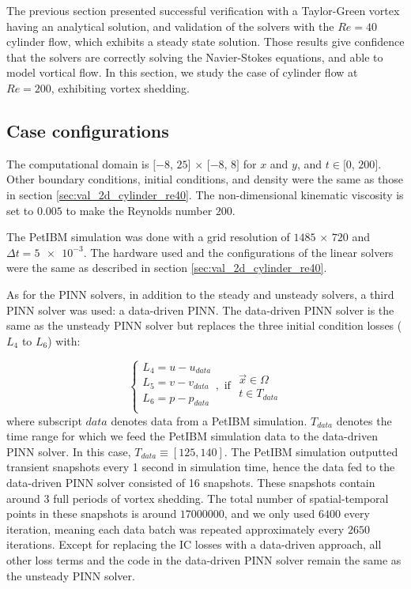 
The previous section presented successful verification with a Taylor-Green vortex having an analytical solution, and validation of the solvers with the $Re=40$ cylinder flow, which exhibits a steady state solution.
Those results give confidence that the solvers are correctly solving the Navier-Stokes equations, and able to model vortical flow. In this section, we study the case of cylinder flow at $Re=200$, exhibiting vortex shedding.

\subsection{Case configurations}

The computational domain is $[-8$, $25]$ $\times$ $[-8$, $8]$ for $x$ and $y$, and $t\in[0$, $200]$.
Other boundary conditions, initial conditions, and density were the same as those in section \ref{sec:val_2d_cylinder_re40}.
The non-dimensional kinematic viscosity is set to $0.005$ to make the Reynolds number $200$.

The PetIBM simulation was done with a grid resolution of $1485$ $\times$ $720$ and $\Delta t = \num{5e-3}$.
The hardware used and the configurations of the linear solvers were the same as described in section \ref{sec:val_2d_cylinder_re40}.

As for the PINN solvers, in addition to the steady and unsteady solvers, a third PINN solver was used: a data-driven PINN.
The data-driven PINN solver is the same as the unsteady PINN solver but replaces the three initial condition losses ($L_4$ to $L_6$) with:

\begin{equation}\label{eq:data-driven-loss}
    \left\{
        \begin{array}{l}
            L_4 = u - u_{data}\\
            L_5 = v - v_{data}\\
            L_6 = p - p_{data}\\
        \end{array}
    \right.
    ,\text{ if }
    \begin{array}{l}
        \vec{x} \in \Omega \\
        t \in T_{data}
    \end{array}
\end{equation}
where subscript $data$ denotes data from a PetIBM simulation.
$T_{data}$ denotes the time range for which we feed the PetIBM simulation data to the data-driven PINN solver.
In this case, $T_{data} \equiv \left[125, 140\right]$.
The PetIBM simulation outputted transient snapshots every 1 second in simulation time, hence the data fed to the data-driven PINN solver consisted of 16 snapshots.
These snapshots contain around $3$ full periods of vortex shedding.
The total number of spatial-temporal points in these snapshots is around $\num{17000000}$, and we only used $\num{6400}$ every iteration, meaning each data batch was repeated approximately every $\num{2650}$ iterations.
Except for replacing the IC losses with a data-driven approach, all other loss terms and the code in the data-driven PINN solver remain the same as the unsteady PINN solver.

